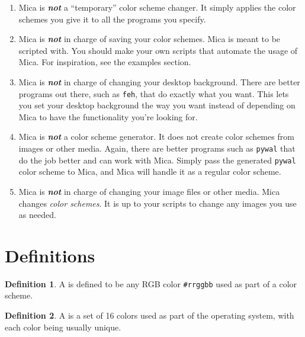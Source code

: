 \documentclass{article}
\theoremstyle{definition}
\newtheorem{definition}{Definition}
\begin{document}
    \begin{enumerate}
        \item Mica is \emph{\textbf{not}} a ``temporary'' color scheme changer. It simply applies the color schemes you give it to all the programs you specify.
        \item Mica is \emph{\textbf{not}} in charge of saving your color schemes. Mica is meant to be scripted with. You should make your own scripts that automate the usage of Mica. For inspiration, see the examples section.
        \item Mica is \emph{\textbf{not}} in charge of changing your desktop background. There are better programs out there, such as \texttt{feh}, that do exactly what you want. This lets you set your desktop background the way you want instead of depending on Mica to have the functionality you're looking for.
        \item Mica is \emph{\textbf{not}} a color scheme generator. It does not create color schemes from images or other media. Again, there are better programs such as \texttt{pywal} that do the job better and can work with Mica. Simply pass the generated \texttt{pywal} color scheme to Mica, and Mica will handle it as a regular color scheme.
        \item Mica is \emph{\textbf{not}} in charge of changing your image files or other media. Mica changes \emph{color schemes}. It is up to your scripts to change any images you use as needed.
    \end{enumerate}

    \newpage


    \section{Definitions}

    \begin{definition}
        A  is defined to be any RGB color \texttt{\#rrggbb} used as part of a color scheme.
    \end{definition}

    \begin{definition}
        A  is a set of 16 colors used as part of the operating system, with each color being usually unique.
    \end{definition}
\end{document}
